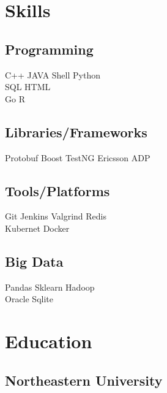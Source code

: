 \documentclass[]{plushcv}
\begin{document}
\begin{minipage}[t]{0.25\textwidth} 


\section{Skills}
\subsection{Programming}
\sectionsep
{}
C++ \textbullet{} JAVA \textbullet{} Shell \textbullet{} Python    \\ SQL \textbullet{} HTML \\
\sectionsep
{}
Go \textbullet{} R \\
\sectionsep
\sectionsep
\subsection{Libraries/Frameworks}
\sectionsep
Protobuf \textbullet{} Boost \textbullet{} TestNG \textbullet{} Ericsson ADP \\
\sectionsep
\sectionsep
\subsection{Tools/Platforms}
\sectionsep
Git \textbullet{} Jenkins \textbullet{} Valgrind \textbullet{} Redis    \\ Kubernet \textbullet{} Docker \\
\sectionsep
\sectionsep
\subsection{Big Data}
\sectionsep
Pandas \textbullet{} Sklearn \textbullet{} Hadoop \\Oracle \textbullet{} Sqlite \\
\sectionsep


\section{Education} 
\subsection{Northeastern University}


\end{minipage}
\end{document}
